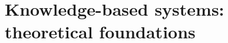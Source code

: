 
\chapter{Knowledge-based systems: theoretical foundations}\label{ch4}
\normalsize
\minitoc

\clearpage